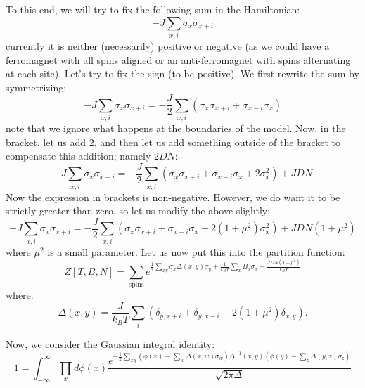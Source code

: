 To this end, we will try to fix the following sum in the Hamiltonian:
\begin{equation}
    -J\sum_{x, i}\sigma_x\sigma_{x+i}
\end{equation}
currently it is neither (necessarily) positive or negative (as we could have a ferromagnet with all spins aligned or an anti-ferromagnet with spins alternating at each site). Let's try to fix the sign (to be positive). We first rewrite the sum by symmetrizing:
\begin{equation}
    -J\sum_{x, i}\sigma_x\sigma_{x+i} = -\frac{J}{2}\sum_{x, i}\left(\sigma_x\sigma_{x+i} + \sigma_{x-i}\sigma_x\right)
\end{equation}
note that we ignore what happens at the boundaries of the model. Now, in the bracket, let us add $2$, and then let us add something outside of the bracket to compensate this addition; namely $2DN$:
\begin{equation}
    -J\sum_{x, i}\sigma_x\sigma_{x+i} = -\frac{J}{2}\sum_{x, i}\left(\sigma_x\sigma_{x+i} + \sigma_{x-i}\sigma_x + 2\sigma_x^2\right) + JDN
\end{equation}
Now the expression in brackets is non-negative. However, we do want it to be strictly greater than zero, so let us modify the above slightly:
\begin{equation}
    -J\sum_{x, i}\sigma_x\sigma_{x+i} = -\frac{J}{2}\sum_{x, i}\left(\sigma_x\sigma_{x+i} + \sigma_{x-i}\sigma_x + 2(1+\mu^2)\sigma_x^2\right) + JDN(1+\mu^2)
\end{equation}
where $\mu^2$ is a small parameter. Let us now put this into the partition function:
\begin{equation}
    Z[T, B, N] = \sum_{\text{spins}}e^{\frac{1}{2}\sum_{xy}\sigma_x\Delta(x, y)\sigma_y + \frac{1}{k_B T}\sum_x B_x \sigma_x - \frac{JDN(1+\mu^2)}{k_B T}}
\end{equation}
where:
\begin{equation}
    \Delta(x, y) = \frac{J}{k_B T}\sum_i\left(\delta_{y, x+i} + \delta_{y, x-i} + 2(1+\mu^2)\delta_{x,y}\right).
\end{equation}

Now, we consider the Gaussian integral identity:
\begin{equation}
    1 = \int_{-\infty}^\infty \prod_x d\phi(x) \frac{e^{-\frac{1}{2}\sum_{xy}\left(\phi(x) - \sum_w \Delta(x, w)\sigma_w\right)\Delta^{-1}(x, y)\left(\phi(y) - \sum_z \Delta(y, z)\sigma_z\right)}}{\sqrt{2\pi\Delta}}
\end{equation}

